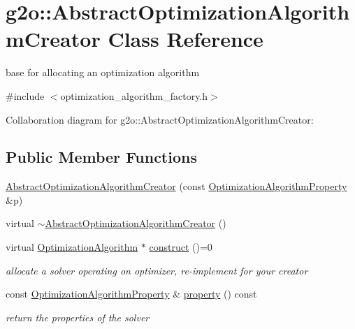 \hypertarget{classg2o_1_1AbstractOptimizationAlgorithmCreator}{}\section{g2o\+:\+:Abstract\+Optimization\+Algorithm\+Creator Class Reference}
\label{classg2o_1_1AbstractOptimizationAlgorithmCreator}


base for allocating an optimization algorithm  




{\ttfamily \#include $<$optimization\+\_\+algorithm\+\_\+factory.\+h$>$}



Collaboration diagram for g2o\+:\+:Abstract\+Optimization\+Algorithm\+Creator\+:
\subsection*{Public Member Functions}
\begin{DoxyCompactItemize}
\item 
\hyperlink{classg2o_1_1AbstractOptimizationAlgorithmCreator_ae9f64a630d2e641043aabc98660495d8}{Abstract\+Optimization\+Algorithm\+Creator} (const \hyperlink{structg2o_1_1OptimizationAlgorithmProperty}{Optimization\+Algorithm\+Property} \&p)
\item 
virtual \hyperlink{classg2o_1_1AbstractOptimizationAlgorithmCreator_a8832e6083876766797176fb0d93b4554}{$\sim$\+Abstract\+Optimization\+Algorithm\+Creator} ()
\item 
virtual \hyperlink{classg2o_1_1OptimizationAlgorithm}{Optimization\+Algorithm} $\ast$ \hyperlink{classg2o_1_1AbstractOptimizationAlgorithmCreator_a96a737bda0f932ac7dd51aa468795353}{construct} ()=0
\begin{DoxyCompactList}\small\item\em allocate a solver operating on optimizer, re-\/implement for your creator \end{DoxyCompactList}\item 
const \hyperlink{structg2o_1_1OptimizationAlgorithmProperty}{Optimization\+Algorithm\+Property} \& \hyperlink{classg2o_1_1AbstractOptimizationAlgorithmCreator_af070d079a64f6d23afe6df25e154b160}{property} () const 
\begin{DoxyCompactList}\small\item\em return the properties of the solver \end{DoxyCompactList}\end{DoxyCompactItemize}
